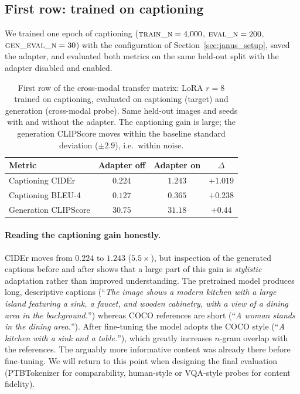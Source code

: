 \subsection{First row: trained on captioning}
\label{sec:row_captioning}

We trained one epoch of captioning ($\textsc{train\_n}=4{,}000$,
$\textsc{eval\_n}=200$, $\textsc{gen\_eval\_n}=30$) with the configuration
of Section~\ref{sec:janus_setup}, saved the adapter, and evaluated both
metrics on the same held-out split with the adapter disabled and enabled.

\begin{table}[h]
\centering
\small
\begin{tabular}{lccc}
\toprule
Metric & Adapter off & Adapter on & $\Delta$ \\
\midrule
Captioning CIDEr   & $0.224$ & $1.243$ & $\mathbf{+1.019}$ \\
Captioning BLEU-4  & $0.127$ & $0.365$ & $+0.238$ \\
Generation CLIPScore & $30.75$ & $31.18$ & $+0.44$ \\
\bottomrule
\end{tabular}
\caption{First row of the cross-modal transfer matrix: LoRA $r{=}8$ trained
on captioning, evaluated on captioning (target) and generation (cross-modal
probe). Same held-out images and seeds with and without the adapter. The
captioning gain is large; the generation CLIPScore moves within the baseline
standard deviation ($\pm 2.9$), i.e.\ within noise.}
\label{tab:row_captioning}
\end{table}

\paragraph{Reading the captioning gain honestly.} CIDEr moves from $0.224$ to
$1.243$ ($5.5\times$), but inspection of the generated captions before and
after shows that a large part of this gain is \emph{stylistic} adaptation
rather than improved understanding. The pretrained model produces long,
descriptive captions (``\emph{The image shows a modern kitchen with a large
island featuring a sink, a faucet, and wooden cabinetry, with a view of a
dining area in the background.}'') whereas COCO references are short
(``\emph{A woman stands in the dining area.}''). After fine-tuning the model
adopts the COCO style (``\emph{A kitchen with a sink and a table.}''), which
greatly increases $n$-gram overlap with the references. The arguably more
informative content was already there before fine-tuning. We will return to
this point when designing the final evaluation (PTBTokenizer for comparability,
human-style or VQA-style probes for content fidelity).

